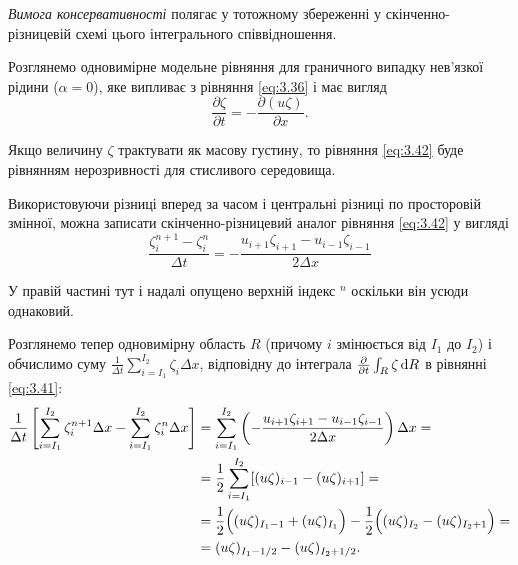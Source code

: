 \begin{definition}
    \textit{Вимога консервативності} полягає у тотожному збереженні у скінченно-різницевій схемі цього інтегрального співвідношення.
\end{definition}

Розглянемо одновимірне модельне рівняння для граничного випадку нев'язкої рідини ($\alpha = 0$), яке випливає з рівняння \eqref{eq:3.36} і має вигляд
\begin{equation}
    \label{eq:3.42}
    \frac{\partial \zeta}{\partial t} = - \frac{\partial (u \zeta)}{\partial x}.
\end{equation}

\begin{remark}
    Якщо величину $\zeta$ трактувати як масову густину, то рівняння \eqref{eq:3.42} буде рівнянням нерозривності для стисливого середовища.
\end{remark}

Використовуючи різниці вперед за часом і центральні різниці по просторовій змінної, можна записати скінченно-різницевий аналог рівняння \eqref{eq:3.42} у вигляді
\begin{equation*}
    \frac{\zeta_i^{n + 1} - \zeta_i^n}{\Delta t} = - \frac{u_{i + 1} \zeta_{i + 1} - u_{i - 1} \zeta_{i - 1}}{2 \Delta x}
\end{equation*}

\begin{remark}
    У правій частині тут і надалі опущено верхній індекс ${}^n$ оскільки він усюди однаковий.
\end{remark}

Розглянемо тепер одновимірну область $R$ (причому $i$ змінюється від $I_1$ до $I_2$) і обчислимо суму $\frac{1}{\Delta t} \sum_{i = I_1}^{I_2} \zeta_i \Delta x$, відповідну до інтеграла $\frac{\partial}{\partial t} \int_R \zeta \mathop{}\!\mathrm{d} R$ в рівнянні \eqref{eq:3.41}:
\begin{align}
    \frac{1}{\Delta t} \left[ \sum_{i = I_1}^{I_2} \zeta_i^{n + 1} \Delta x - \sum_{i = I_1}^{I_2} \zeta_i^n \Delta x \right] &= \sum_{i = I_1}^{I_2} \left( - \frac{u_{i + 1} \zeta_{i + 1} - u_{i - 1} \zeta_{i - 1}}{2 \Delta x} \right) \Delta x = \nonumber \\
    \label{eq:3.43}
    &= \frac{1}{2} \sum_{i = I_1}^{I_2} [(u \zeta)_{i - 1} - (u \zeta)_{i + 1}] = \\
    &= \frac{1}{2} \Big( (u\zeta)_{I_1 - 1} + (u\zeta)_{I_1} \Big) - \frac{1}{2} \Big( (u\zeta)_{I_2} - (u\zeta)_{I_2 + 1} \Big) = \nonumber \\
    \label{eq:3.44}
    &= (u \zeta)_{I_1 - 1/2} - (u \zeta)_{I_2 + 1/2}.
\end{align}

